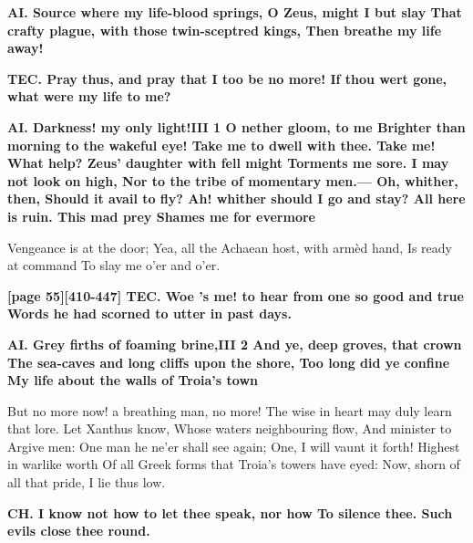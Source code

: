 \documentclass[11pt,letter]{book}
\begin{document}
\par \textbf{AI. Source where my life-blood springs, O Zeus, might I but slay That crafty plague, with those twin-sceptred kings, Then breathe my life away!}
\par 

\par \textbf{TEC. Pray thus, and pray that I too be no more! If thou wert gone, what were my life to me?}
\par 

\par \textbf{AI. Darkness! my only light!III 1 O nether gloom, to me Brighter than morning to the wakeful eye! Take me to dwell with thee. Take me! What help? Zeus’ daughter with fell might Torments me sore. I may not look on high, Nor to the tribe of momentary men.— Oh, whither, then, Should it avail to fly? Ah! whither should I go and stay? All here is ruin. This mad prey Shames me for evermore}
\par   Vengeance is at the door; Yea, all the Achaean host, with armèd hand, Is ready at command To slay me o’er and o’er.

\par \textbf{[page 55][410-447] TEC. Woe ’s me! to hear from one so good and true Words he had scorned to utter in past days.}
\par 

\par \textbf{AI. Grey firths of foaming brine,III 2 And ye, deep groves, that crown The sea-caves and long cliffs upon the shore, Too long did ye confine My life about the walls of Troia’s town}
\par   But no more now! a breathing man, no more! The wise in heart may duly learn that lore. Let Xanthus know, Whose waters neighbouring flow, And minister to Argive men:  One man he ne’er shall see again; One, I will vaunt it forth! Highest in warlike worth Of all Greek forms that Troia’s towers have eyed:  Now, shorn of all that pride, I lie thus low.

\par \textbf{CH. I know not how to let thee speak, nor how To silence thee. Such evils close thee round.}
\par 
\end{document}
